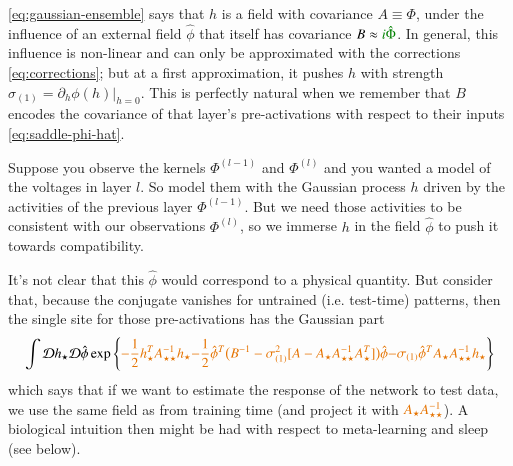 \documentclass[../main.tex]{subfiles}
\begin{document}
\eqref{eq:gaussian-ensemble} says that $h$ is a field with covariance $A \equiv \Phi$, under the influence of an external field $\hat \phi$ that itself has covariance $B \approx \typo{i \hat \Phi}$. In general, this influence is non-linear and can only be approximated with the corrections \eqref{eq:corrections}; but at a first approximation, it pushes $h$ with strength $\sigma_{(1)} = \left. \partial_h \phi(h) \right|_{h=0}$. This is perfectly natural when we remember that $B$ encodes the covariance of that layer's pre-activations with respect to their inputs \eqref{eq:saddle-phi-hat}. 

Suppose you observe the kernels $\Phi^{(l-1)}$ and $\Phi^{(l)}$ and you wanted a model of the voltages in layer $l$. So model them with the Gaussian process $h$ driven by the activities of the previous layer $\Phi^{(l-1)}$. But we need those activities to be consistent with our observations $\Phi^{(l)}$, so we immerse $h$ in the field $\hat \phi$ to push it towards compatibility. 

It's not clear that this $\hat \phi$ would correspond to a physical quantity. But consider that, because the conjugate vanishes for untrained (i.e. test-time) patterns, then the single site for those pre-activations has the Gaussian part
\begin{align*}
  \int \mathcal D h_{\star} \mathcal D \hat \phi
    \exp \left \{
      \fix{- \frac12 h_{\star}^T A_{\star\star}^{-1} h_{\star}}
      \fix{- \frac12 \hat \phi^T \big(B^{-1} - \sigma_{(1)}^2 [A - A_{\star} A_{\star\star}^{-1} A_{\star}^T] \big) \hat \phi}
      \fix{- \sigma_{(1)} \hat \phi^T A_{\star} A_{\star\star}^{-1} h_{\star}}
    \right \}
\end{align*}
which says that if we want to estimate the response of the network to test data, we use the same field as from training time (and project it with $\fix{A_{\star} A_{\star\star}^{-1}}$). A biological intuition then might be had with respect to meta-learning and sleep (see below).
\end{document}
